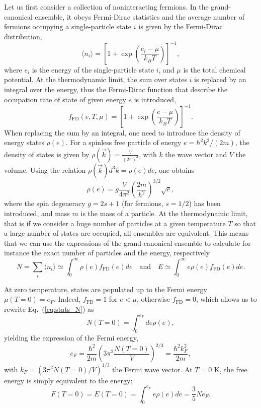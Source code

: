 Let us first consider a collection of noninteracting fermions. In the 
grand-canonical ensemble, it obeys Fermi-Dirac statistics and the average 
number of fermions occupying a single-particle state $i$ is given by the 
Fermi-Dirac distribution, 
%
\begin{equation}
  \langle n_i \rangle 
  = \left[1+\exp\left(\frac{e_i-\mu}{k_B T}\right)\right]^{-1},
\end{equation}
%
where $e_i$ is the energy of the single-particle state $i$, and $\mu$ is the
total chemical potential.
At the thermodynamic limit, the sum over states $i$ is replaced by an integral
over the energy, thus the Fermi-Dirac function that describe the
occupation rate of state of given energy $e$ is introduced,
%
\begin{equation}
  f_{\text{FD}}(e, T, \mu) 
  = \left[1+\exp\left(\frac{e-\mu}{k_B T}\right)\right]^{-1}.\label{eq:fFD}
\end{equation}
%
When replacing the sum by an integral, one need to introduce the density of
energy states $\rho(e)$. For a spinless free particle of energy $e=\hbar^2 
k^2/(2m)$, the density of states is given by $\rho(\vec{k}) =
\frac{V}{(2\pi)^3}$, with $k$ the wave vector and $V$ the volume. Using the 
relation $\rho(\vec{k})d^3k = \rho(e)de$, one obtains
%
\begin{equation}
  \rho(e) = g\frac{V}{4\pi^2}\left(\frac{2m}{\hbar^2}\right)^{3/2}\sqrt{e},
\end{equation}
%
where the spin degeneracy $g=2s+1$ (for fermions, $s=1/2$) has been introduced, 
and mass $m$ is the mass of a particle.
At the thermodynamic limit, that is if we consider a huge number of particles
at a given temperature $T$ so that a large number of states are occupied, all
ensembles are equivalent. This means that we can use the expressions of 
the grand-canonical ensemble to calculate for instance the exact number of 
particles and the energy, respectively
%
\begin{equation}
  N = \sum_i\langle n_i\rangle \simeq \int_0^\infty
  \rho(e)f_{\text{FD}}(e)de
  \quad \text{and} \quad 
  E \simeq \int_0^\infty e \rho(e) f_{\text{FD}}(e)de.\label{eq:stats_N}
\end{equation}
%

At zero temperature, states are populated up to the Fermi energy $\mu(T=0) =
e_F$. Indeed, $f_{\text{FD}} = 1$ for $e < \mu$, otherwise $f_{\text{FD}} = 0$, 
which allows us to rewrite Eq.~(\ref{eq:stats_N}) as
%
\begin{equation}
  N(T=0) = \int_0^{e_F} de\rho(e),
\end{equation}
%
yielding the expression of the Fermi energy,
%
\begin{equation}
  e_F = \frac{\hbar^2}{2m}\left(3\pi^2\frac{N(T=0)}{V}\right)^{2/3} =
  \frac{\hbar^2 k_F^2}{2m},\label{eq:eF}
\end{equation}
%
with $k_F=(3\pi^2N(T=0)/V)^{1/3}$ the Fermi wave vector.
At $T=0$ K, the free energy is simply equivalent to the energy:
%
\begin{equation}
  F(T=0) = E(T=0) = \int_0^{e_F} e\rho(e)de = \frac{3}{5}Ne_F.
\end{equation}
%


